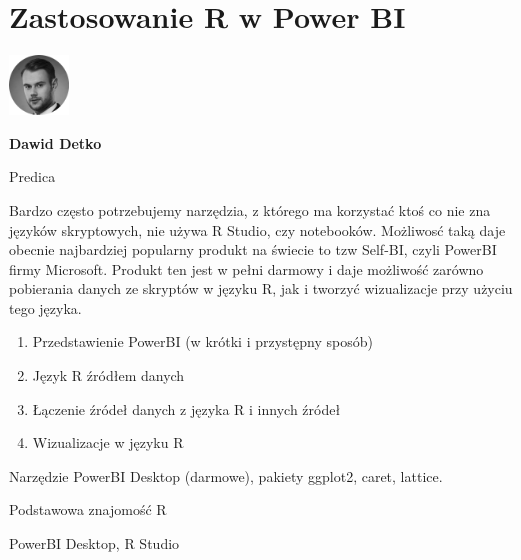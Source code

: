 \documentclass[\main/boa.tex]{subfiles}
\begin{document}
\section{Zastosowanie R w Power BI}
\begin{minipage}[t]{0.915\textwidth}
	\center     
    \includegraphics[width=60px]{img/workshops/czarno_biale/ddetko-crop.png} 
\end{minipage}

\begin{minipage}{0.915\textwidth}
\centering
{\bf {} Dawid Detko}
\end{minipage}

\vskip 0.3cm

\begin{affiliations}
\begin{minipage}{0.915\textwidth}
\centering
\large Predica  \\[2pt]
\end{minipage}
\end{affiliations}

\vskip 0.8cm

\opiswarsztatu Bardzo często potrzebujemy narzędzia, z którego ma korzystać ktoś co nie zna języków skryptowych, nie używa R Studio, czy notebooków. Możliwosć taką daje obecnie najbardziej popularny produkt na świecie to tzw Self-BI, czyli PowerBI firmy Microsoft. Produkt ten jest w pełni darmowy i daje możliwość zarówno pobierania danych ze skryptów w języku R, jak i tworzyć wizualizacje przy użyciu tego języka.

\planwarsztatu
\begin{enumerate}
\item Przedstawienie PowerBI (w krótki i przystępny sposób)
\item Język R źródłem danych
\item Łączenie źródeł danych z języka R i innych źródeł
\item Wizualizacje w języku R
\end{enumerate}	 

\pakiety Narzędzie PowerBI Desktop (darmowe), pakiety ggplot2, caret, lattice.

\umiejetnosci Podstawowa znajomość R

\wymagania PowerBI Desktop, R Studio
\end{document}
